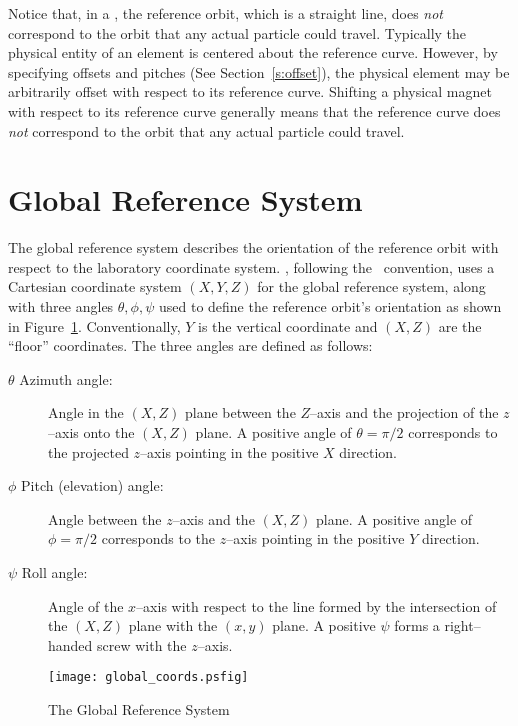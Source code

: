 Notice that, in a ,
the reference orbit, which is a straight
line, does {\em not} correspond to the orbit that any actual particle
could travel. Typically the physical entity of an element is centered
about the reference curve. However, by specifying offsets and pitches
(See Section~\ref{s:offset}), the physical element may be
arbitrarily offset with respect to its reference curve.
Shifting a physical magnet with respect to its
reference curve generally means that the reference curve does {\em
not} correspond to the orbit that any actual particle could travel.

\section{Global Reference System}
\label{s:global}

The global reference system describes the orientation of the reference
orbit with respect to the laboratory coordinate system.  \bmad,
following the \mad\ convention, uses a Cartesian coordinate system
$(X, Y, Z)$ for the global reference system, along with three angles
$\theta, \phi, \psi$ used to define the reference orbit's orientation
as shown in Figure~\ref{f:global_coords}. Conventionally, $Y$ is the
vertical coordinate and $(X, Z)$ are the ``floor'' coordinates.  The
three angles are defined as follows:
\begin{description}
\item[$\theta$ Azimuth angle:] Angle in the $(X, Z)$ plane 
between the $Z$--axis and the projection of the $z$--axis onto the
$(X, Z)$ plane. A positive angle of $\theta = \pi/2$ corresponds to the
projected $z$--axis pointing in the positive $X$ direction.
\item[$\phi$ Pitch (elevation) angle:] Angle between the $z$--axis 
and the $(X,Z)$ plane. A positive angle of $\phi = \pi/2$ corresponds to
the $z$--axis pointing in the positive $Y$ direction.
\item[$\psi$ Roll angle:] Angle of the $x$--axis with respect 
to the line formed by the
intersection of the $(X, Z)$ plane with the $(x, y)$ plane. A
positive $\psi$ forms a right--handed screw with the $z$--axis.
\end{description}

\begin{figure}
\centering
\texttt{[image: global\_coords.psfig]}
\caption{The Global Reference System}
\label{f:global_coords}
\end{figure}

